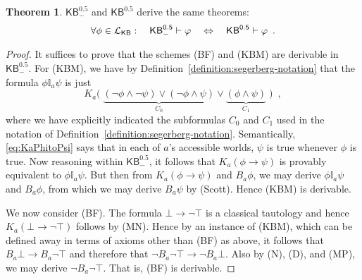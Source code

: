 \documentclass[12pt]{article}
\theoremstyle{definition}
\newtheorem{theorem}{Theorem}[section]
\newcommand{\Lang}{{\cal L}}   %
\newcommand{\KB}{{\mathsf{KB}}}                        %
\newcommand{\KBeq}{{\mathsf{KB}^{\mathsf{0.5}}}}       %
\newcommand{\KBeqm}{{\mathsf{KB}^{\mathsf{0.5}}_{-}}}  %
\begin{document}
\begin{theorem}
  \label{theorem:KBminus}
  $\KBeqm$ and $\KBeq$ derive the same theorems:
  \[
  \forall\phi\in\Lang_\KB:\quad
  \KBeqm\vdash\varphi \quad\Leftrightarrow\quad \KBeq\vdash\varphi\enspace.
  \]
\end{theorem}
\begin{proof}
  It suffices to prove that the schemes (BF) and (KBM) are derivable
  in $\KBeqm$. For (KBM), we have by
  Definition~\ref{definition:segerberg-notation} that the formula
  $\phi\mathbb{I}_a\psi$ is just
  \begin{equation}
    K_a\bigl(\;
    \underbrace{(\lnot\phi\land\lnot\psi) \lor (\lnot\phi\land\psi)}_{C_0} \lor
    \underbrace{(\phi\land\psi)}_{C_1}
    \;\bigr)\enspace,
    \label{eq:KaPhitoPsi}
  \end{equation}
  where we have explicitly indicated the subformulas $C_0$ and $C_1$
  used in the notation of
  Definition~\ref{definition:segerberg-notation}.  Semantically,
  \eqref{eq:KaPhitoPsi} says that in each of $a$'s accessible worlds,
  $\psi$ is true whenever $\phi$ is true.  Now reasoning within
  $\KBeqm$, it follows that $K_a(\phi\to\psi)$ is provably equivalent
  to $\phi\mathbb{I}_a\psi$.  But then from $K_a(\phi\to\psi)$ and
  $B_a\phi$, we may derive $\phi\mathbb{I}_a\psi$ and $B_a\phi$, from
  which we may derive $B_a\psi$ by (Scott). Hence (KBM) is derivable.

  We now consider (BF).  The formula $\bot\to\lnot\top$ is a classical
  tautology and hence $K_a(\bot\to\lnot\top)$ follows by (MN).  Hence
  by an instance of (KBM), which can be defined away in terms of
  axioms other than (BF) as above, it follows that $B_a\bot\to
  B_a\lnot\top$ and therefore that $\lnot B_a\lnot\top\to\lnot
  B_a\bot$.  Also by (N), (D), and (MP), we may derive $\lnot
  B_a\lnot\top$.  That is, (BF) is derivable.
\end{proof}
\end{document}

